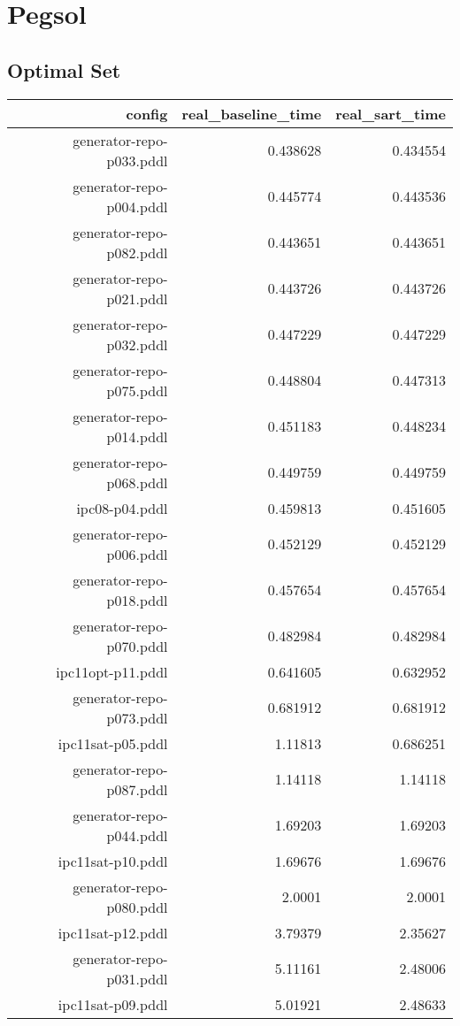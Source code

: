 \documentclass{article}
\begin{document}
                \newpage \section{Pegsol}
                    \subsection*{Optimal Set}
                    
                            \begin{center}
                            \scriptsize
                            \begin{tabular}{r|r|r}
                            config & real\_baseline\_time & real\_sart\_time\\\midrule
                             generator-repo-p033.pddl&0.438628&0.434554\\
 generator-repo-p004.pddl&0.445774&0.443536\\
 generator-repo-p082.pddl&0.443651&0.443651\\
 generator-repo-p021.pddl&0.443726&0.443726\\
 generator-repo-p032.pddl&0.447229&0.447229\\
 generator-repo-p075.pddl&0.448804&0.447313\\
 generator-repo-p014.pddl&0.451183&0.448234\\
 generator-repo-p068.pddl&0.449759&0.449759\\
 ipc08-p04.pddl&0.459813&0.451605\\
 generator-repo-p006.pddl&0.452129&0.452129\\
 generator-repo-p018.pddl&0.457654&0.457654\\
 generator-repo-p070.pddl&0.482984&0.482984\\
 ipc11opt-p11.pddl&0.641605&0.632952\\
 generator-repo-p073.pddl&0.681912&0.681912\\
 ipc11sat-p05.pddl&1.11813&0.686251\\
 generator-repo-p087.pddl&1.14118&1.14118\\
 generator-repo-p044.pddl&1.69203&1.69203\\
 ipc11sat-p10.pddl&1.69676&1.69676\\
 generator-repo-p080.pddl&2.0001&2.0001\\
 ipc11sat-p12.pddl&3.79379&2.35627\\
 generator-repo-p031.pddl&5.11161&2.48006\\
 ipc11sat-p09.pddl&5.01921&2.48633\\

\end{tabular}
\end{center}
\end{document}
